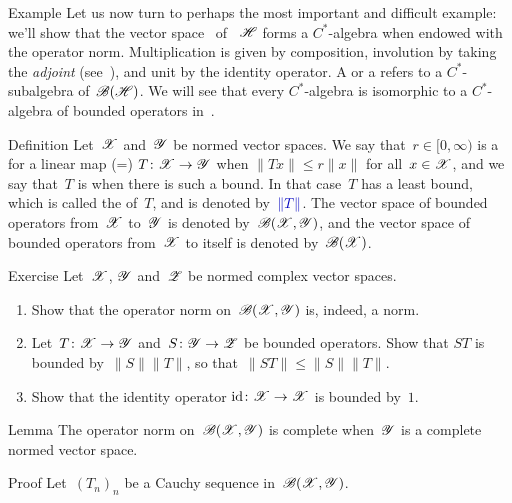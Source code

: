 \documentclass[main]{subfiles}
\begin{document}
\begin{parsec}[hilb]%
\begin{point}{Example}%
Let us now turn to perhaps the most important
and difficult example:
we'll show that the vector space~\Define{$\scrB(\scrH)$} 
of ~$\mathscr{H}$ forms a $C^*$-algebra
when endowed with the operator 
norm.
Multiplication is given by composition,
involution by taking the \emph{adjoint} (see~),
and unit by the identity operator.
A  or
a  
refers to a $C^*$-subalgebra of~$\scrB(\scrH)$.
We will see that every $C^*$-algebra is isomorphic to a $C^*$-algebra
of bounded operators in~.
\end{point}
\begin{point}{Definition}%
Let~$\mathscr{X}$ and~$\mathscr{Y}$ be normed
vector spaces.
We say that~$r\in [0,\infty)$
is a  for a linear map (=) 
$T\colon \mathscr{X}\to\mathscr{Y}$
when  $\|Tx\|\leq r\|x\|$ for all~$x\in \mathscr{X}$,
and we say that~$T$ is 
when there is such a bound.
In that case~$T$ has a least bound,
which is called the  of~$T$,
and is denoted by~$\Define{\|T\|}$.
The vector space of bounded operators
from~$\mathscr{X}$ to~$\mathscr{Y}$
is denoted by~$\mathscr{B}(\mathscr{X},\mathscr{Y})$,
and the vector space of bounded operators
from~$\mathscr{X}$ to itself is denoted by~$\mathscr{B}(\mathscr{X})$.
\end{point}
\begin{point}{Exercise}%
Let~$\mathscr{X}$, $\mathscr{Y}$ and~$\mathscr{Z}$ be normed complex vector spaces.
\begin{enumerate}
\item
Show that the operator norm on~$\mathscr{B}(\mathscr{X},\mathscr{Y})$
is, indeed, a norm.
\item
Let~$T\colon \mathscr{X}\to \mathscr{Y}$ and~$S\colon \mathscr{Y}\to\mathscr{Z}$
be bounded operators.
Show that $ST$ is bounded by~$\|S\|\|T\|$,
so that~$\|ST\|\leq\|S\|\|T\|$.
\item
Show that the identity operator $\operatorname{id}\colon \mathscr{X}\to \mathscr{X}$
is bounded by~$1$.
\end{enumerate}
\end{point}
\begin{point}{Lemma}%
The operator norm on~$\mathscr{B}(\mathscr{X},\mathscr{Y})$ is complete
when~$\mathscr{Y}$ is a complete normed vector space.
\begin{point}{Proof}%
Let~$(T_n)_n$ be a Cauchy sequence in~$\mathscr{B}(\mathscr{X},\mathscr{Y})$.

\end{point}
\end{point}
\end{parsec}
\end{document}
